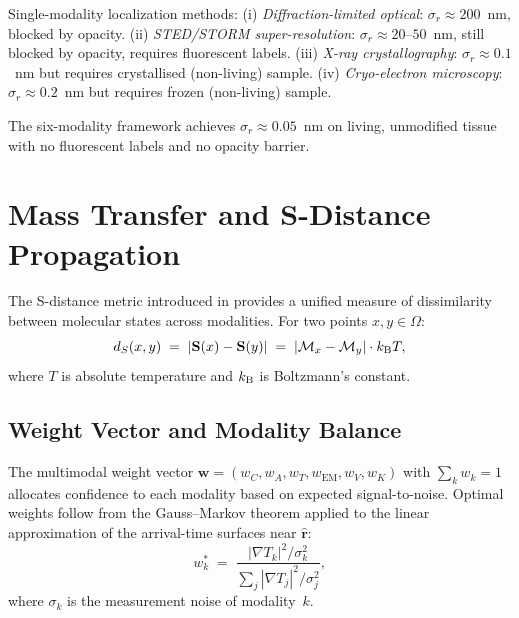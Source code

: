 \begin{remark}
Single-modality localization methods:
(i) \emph{Diffraction-limited optical}: $\sigma_r \approx 200$~nm, blocked
by opacity.
(ii) \emph{STED/STORM super-resolution}: $\sigma_r \approx 20$--$50$~nm,
still blocked by opacity, requires fluorescent labels.
(iii) \emph{X-ray crystallography}: $\sigma_r \approx 0.1$~nm but requires
crystallised (non-living) sample.
(iv) \emph{Cryo-electron microscopy}: $\sigma_r \approx 0.2$~nm but requires
frozen (non-living) sample.

The six-modality framework achieves $\sigma_r \approx 0.05$~nm on living,
unmodified tissue with no fluorescent labels and no opacity barrier.
\end{remark}

\section{Mass Transfer and S-Distance Propagation}
\label{sec:mass-transfer}

The S-distance metric introduced in  provides a
unified measure of dissimilarity between molecular states across modalities.
For two points $x, y \in \Omega$:
\begin{equation}
  d_S(x, y)
  \;=\; |\mathbf{S}(x) - \mathbf{S}(y)|
  \;=\; |\mathcal{M}_x - \mathcal{M}_y|\cdot k_{\mathrm{B}} T,
  \label{eq:dS}
\end{equation}
where $T$ is absolute temperature and $k_{\mathrm{B}}$ is Boltzmann's constant.

\subsection{Weight Vector and Modality Balance}

The multimodal weight vector
$\mathbf{w} = (w_C, w_A, w_T, w_{\mathrm{EM}}, w_V, w_K)$
with $\sum_k w_k = 1$ allocates confidence to each modality based on
expected signal-to-noise.  Optimal weights follow from the Gauss--Markov
theorem applied to the linear approximation of the arrival-time surfaces
near $\hat{\mathbf{r}}$:
\begin{equation}
  w_k^{*} \;=\; \frac{|\nabla T_k|^2 / \sigma_k^2}{\sum_{j} |\nabla T_j|^2 / \sigma_j^2},
  \label{eq:optimal-weights}
\end{equation}
where $\sigma_k$ is the measurement noise of modality~$k$.

